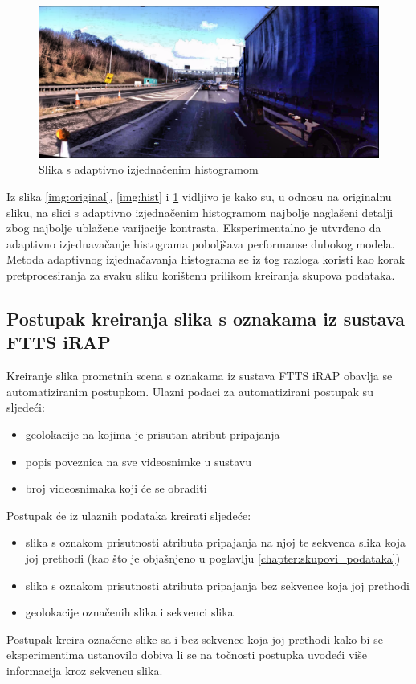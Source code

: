 \documentclass[times, utf8, diplomski, numeric]{fer}
\begin{document}
\begin{figure}[H]
\centering
\includegraphics[scale=0.2]{images/adapt_hist.png}
\caption{Slika s adaptivno izjednačenim histogramom}
\label{img:adapt_hist}
\end{figure}

Iz slika \ref{img:original}, \ref{img:hist} i \ref{img:adapt_hist} vidljivo je kako su, u odnosu na originalnu sliku, na slici s adaptivno izjednačenim histogramom najbolje naglašeni detalji zbog najbolje ublažene varijacije kontrasta.
Eksperimentalno je utvrđeno da adaptivno izjednavačanje histograma poboljšava performanse dubokog modela.
Metoda adaptivnog izjednačavanja histograma se iz tog razloga koristi kao korak pretprocesiranja za svaku sliku korištenu prilikom kreiranja skupova podataka.

\subsection{Postupak kreiranja slika s oznakama iz sustava FTTS iRAP}
Kreiranje slika prometnih scena s oznakama iz sustava FTTS iRAP obavlja se automatiziranim postupkom.
Ulazni podaci za automatizirani postupak su sljedeći:
\begin{itemize}
 \item geolokacije na kojima je prisutan atribut pripajanja
 \item popis poveznica na sve videosnimke u sustavu \citep{url:ftts_irap}
 \item broj videosnimaka koji će se obraditi
\end{itemize}
Postupak će iz ulaznih podataka kreirati sljedeće:
\begin{itemize}
 \item slika s oznakom prisutnosti atributa pripajanja na njoj te sekvenca slika koja joj prethodi (kao što je objašnjeno u poglavlju \ref{chapter:skupovi_podataka})
 \item slika s oznakom prisutnosti atributa pripajanja bez sekvence koja joj prethodi
 \item geolokacije označenih slika i sekvenci slika
\end{itemize}
\noindent Postupak kreira označene slike sa i bez sekvence koja joj prethodi kako bi se eksperimentima ustanovilo dobiva li se na točnosti postupka uvodeći više informacija kroz sekvencu slika.
\end{document}
